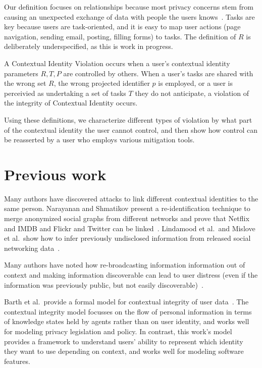 \documentclass{llncs}
\begin{document}
Our definition focuses on relationships because most privacy concerns stem
from causing an unexpected exchange of data with people the users
knows~\cite{wang}. Tasks are key because users are task-oriented, and it is
easy to map user actions (page navigation, sending email, posting, filling
forms) to tasks.  The definition of $R$ is deliberately underspecified, as this
is work in progress.

\begin{definition}
  A Contextual Identity Violation occurs when a user's contextual identity parameters $R,T,P$ are controlled by others.  When a user's tasks are shared with the wrong set $R$, the wrong projected identifier $p$ is employed, or a user is perceivied as undertaking a set of tasks $T$ they do not anticipate, a violation of the integrity of Contextual Identity occurs.
\end{definition}

Using these definitions, we characterize different types of violation by what part of the contextual identity the user cannot control, and then show how control can be reasserted by a user who employs various mitigation tools.

\section{Previous work}

Many authors have discovered attacks to link different contextual identities to
the same person. Narayanan and Shmatikov present a re-identification technique
to merge anonymized social graphs from different networks and prove that
Netflix and IMDB and Flickr and Twitter can be
linked~\cite{narayanan1,narayanan2}. Lindamood et al.~and Mislove et al.~show
how to infer previously undisclosed information from released social networking
data~\cite{lindamood,mislove}.

Many authors have noted how re-broadcasting information information out of
context and making information discoverable can lead to user distress (even if
the information was previously public, but not easily
discoverable)~\cite{boyd1,chew,nissenbaum}.

Barth et al.~provide a formal model for contextual integrity of user
data~\cite{barth}. The contextual integrity model focusses on the flow of
personal information in terms of knowledge states held by agents rather than on
user identity, and works well for modeling privacy legislation and policy. In
contrast, this work's model provides a framework to understand users' ability
to represent which identity they want to use depending on context, and works
well for modeling software features.
\end{document}
